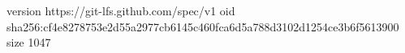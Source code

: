 version https://git-lfs.github.com/spec/v1
oid sha256:cf4e8278753e2d55a2977cb6145c460fca6d5a788d3102d1254ce3b6f5613900
size 1047
